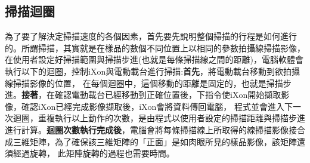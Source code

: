 \documentclass[12pt]{article}
\begin{document}
    \subsection{掃描迴圈}
    為了要了解決定掃描速度的各個因素，首先要先說明整個掃描的行程是如何進行的。所謂掃描，其實就是在樣品的數個不同位置上以相同的參數拍攝線掃描影像，
    在使用者設定好掃描範圍與掃描步進(也就是每條掃描線之間的距離)，電腦軟體會執行以下的迴圈，控制iXon與電動載台進行掃描:\textbf{首先}，將電動載台移動到欲拍攝線掃描影像的位置，
    在每個迴圈中，這個移動的距離是固定的，也就是掃描步進。\textbf{接著}，在確認電動載台已經移動到正確位置後，下指令使iXon開始擷取影像，確認iXon已經完成影像擷取後，iXon會將資料傳回電腦，
    程式並會進入下一次迴圈，重複執行以上動作的次數，是由程式以使用者設定的掃描距離與掃描步進進行計算。\textbf{迴圈次數執行完成後}，電腦會將每條掃描線上所取得的線掃描影像接合成三維矩陣，為了確保該三維矩陣的「正面」是如肉眼所見的樣品影像，該矩陣還須經過旋轉，
    此矩陣旋轉的過程也需要時間。
\end{document}
